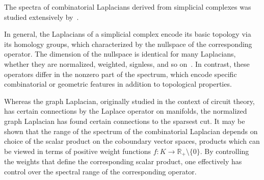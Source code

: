 \documentclass[10pt]{article}
\numberwithin{equation}{section}
\newcommand{\+}{%
	\raisebox{0.18ex}{\scaleobj{0.55}{+}}
}
\theoremstyle{definition}
\begin{document}
The spectra of combinatorial Laplacians derived from simplicial complexes was studied extensively by~\cite{}. 

In general, the Laplacians of a simplicial complex encode its basic topology via its homology groups, which characterized by the nullspace of the corresponding operator.
The dimension of the nullspace is identical for many Laplacians, whether they are normalized, weighted, signless, and so on~\cite{}.
In contrast, these operators differ in the nonzero part of the spectrum, which encode specific combinatorial or geometric features in addition to topological properties. 


Whereas the graph Laplacian, originally studied in the context of circuit theory, has certain connections by the Laplace operator on manifolds, the normalized graph Laplacian has found certain connections to the sparsest cut.
It may be shown that the range of the spectrum of the combinatorial Laplacian depends on choice of the scalar product on the coboundary vector spaces, products which can be viewed in terms of positive weight functions $f: K \to \mathbb{R}_+ \setminus \{0\}$. 
By controlling the weights that define the corresponding scalar product, one effectively has control over the spectral range of the corresponding operator. 
\end{document}
